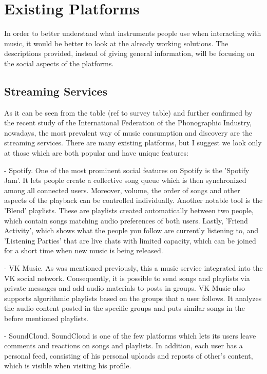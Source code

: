 \chapter{Existing Platforms}
In order to better understand what instruments people use when interacting with music, it would be better
to look at the already working solutions. The descriptions provided, instead of giving general information,
will be focusing on the social aspects of the platforms.


\section{Streaming Services}
As it can be seen from the table (ref to survey table) and further confirmed by
the recent study of the International Federation of the Phonographic Industry\cite{music_stats_2024},
nowadays, the most prevalent way of music consumption
and discovery are the streaming services. There are many existing platforms,
but I suggest we look only at those which are both popular and have unique features:

- Spotify.
One of the most prominent social features on Spotify is the 'Spotify Jam'\cite{spotify_jam}.
It lets people create a collective song queue which is then synchronized among all connected users.
Moreover, volume, the order of songs and other aspects of the playback can be controlled individually.
Another notable tool is the 'Blend' playlists\cite{spotify_recs}. These are playlists created automatically
between two people, which contain songs matching audio preferences of both users.
Lastly, 'Friend Activity'\cite{spotify_friend_activ}, which shows what the people you follow are currently listening to,
and 'Listening Parties' that are live chats with limited capacity,
which can be joined for a short time when new music is being released\cite{spotify_party_1,spotify_party_2}.

- VK Music.
As was mentioned previously, this a music service integrated into the VK social network.
Consequently, it is possible to send songs and playlists via private messages and add audio materials to
posts in groups. VK Music also supports algorithmic playlists based on the groups that a user follows.
It analyzes the audio content posted in the specific groups and puts similar songs in the before mentioned playlists.

- SoundCloud.
SoundCloud is one of the few platforms which lets its users leave comments and reactions on songs and playlists\cite{spotify_party_2,sc_reactions}.
In addition, each user has a personal feed, consisting of his personal uploads and
reposts of other's content\cite{sc_reposts}, which is visible when visiting his profile.


